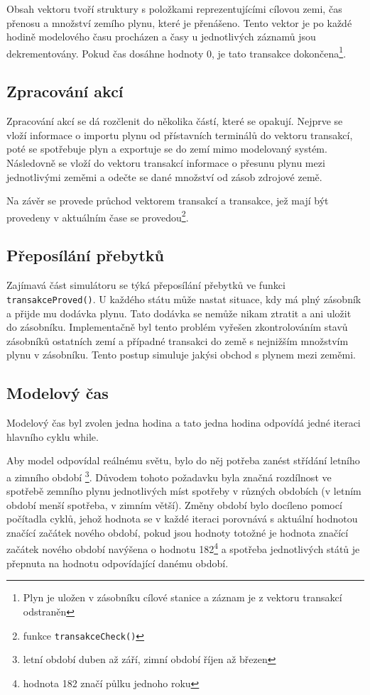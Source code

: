 \documentclass[a4paper,11pt]{article}
\begin{document}
Obsah vektoru tvoří struktury s položkami reprezentujícími cílovou zemi,
čas přenosu a množství zemího plynu, které je přenášeno.
Tento vektor je po každé hodině modelového času procházen a časy u jednotlivých záznamů jsou dekrementovány.
Pokud čas dosáhne hodnoty 0, je tato transakce dokončena\footnote{Plyn je uložen v zásobníku cílové stanice a záznam je z vektoru transakcí odstraněn}. 

\subsection{Zpracování akcí}

Zpracování akcí se dá rozčlenit do několika částí, které se opakují.
Nejprve se vloží informace o importu plynu od přístavních terminálů do vektoru transakcí,
poté se spotřebuje plyn a exportuje se do zemí mimo modelovaný systém.
Následovně se vloží do vektoru transakcí informace o přesunu plynu mezi jednotlivými zeměmi
a odečte se dané množství od zásob zdrojové země.

Na závěr se provede průchod vektorem transakcí a transakce,
jež mají být provedeny v aktuálním čase se provedou\footnote{funkce \texttt{transakceCheck()}}.

\subsection{Přeposílání přebytků}

Zajímavá část simulátoru se týká přeposílání přebytků ve funkci \texttt{transakceProved()}. U každého státu může nastat situace, kdy má plný zásobník a přijde mu dodávka plynu. Tato dodávka se nemůže nikam ztratit a ani uložit do zásobníku. Implementačně byl tento problém vyřešen zkontrolováním stavů zásobníků ostatních zemí a případné transakci do země s nejnižším množstvím plynu v zásobníku. Tento postup simuluje jakýsi obchod s plynem mezi zeměmi. 

\subsection{Modelový čas}

Modelový čas byl zvolen jedna hodina a tato jedna hodina odpovídá jedné iteraci hlavního cyklu while.

Aby model odpovídal reálnému světu, bylo do něj potřeba zanést střídání letního a zimního období
\footnote{letní období duben až září, zimní období říjen až březen}.
Důvodem tohoto požadavku byla značná rozdílnost ve spotřebě zemního plynu jednotlivých míst spotřeby
v různých obdobích (v letním období menší spotřeba, v zimním větší).
Změny období bylo docíleno pomocí počítadla cyklů, jehož hodnota se v každé iteraci porovnává 
s aktuální hodnotou značící začátek nového období, pokud jsou hodnoty totožné 
je hodnota značící začátek nového období navýšena o hodnotu 182\footnote{hodnota 182 značí půlku jednoho roku}
a spotřeba jednotlivých států je přepnuta na hodnotu odpovídající danému období.
\end{document}
